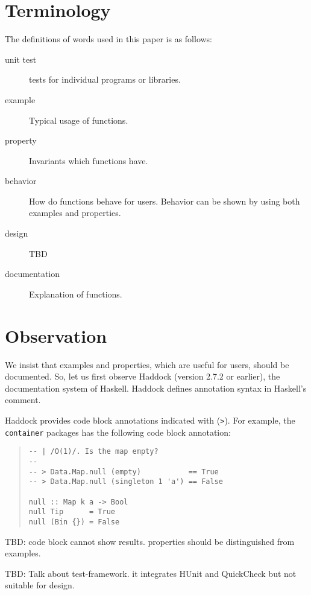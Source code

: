 \documentclass[preprint]{sigplanconf}
\begin{document}
\section{Terminology}

The definitions of words used in this paper is as follows:

\begin{description}
\item[unit test] tests for individual programs or libraries.
\item[example] Typical usage of functions.
\item[property] Invariants which functions have.
\item[behavior] How do functions behave for users. Behavior can be shown by using both examples and properties.
\item[design] TBD
\item[documentation] Explanation of functions.
\end{description}

\section{Observation}

We insist that examples and properties, which are useful for users, should be
documented.
So, let us first observe Haddock (version 2.7.2 or earlier), the documentation system of Haskell. 
Haddock defines annotation syntax in Haskell's comment.

Haddock provides code block annotations indicated with ({\tt >}).
For example, the {\tt container} packages has the following code block annotation:

\begin{quote}
\small
\begin{verbatim}
-- | /O(1)/. Is the map empty?
--
-- > Data.Map.null (empty)           == True
-- > Data.Map.null (singleton 1 'a') == False

null :: Map k a -> Bool
null Tip      = True
null (Bin {}) = False
\end{verbatim}
\end{quote}

TBD: code block cannot show results. properties should be distinguished from examples.

TBD: Talk about test-framework. it integrates HUnit and QuickCheck but not 
suitable for design.
\end{document}
